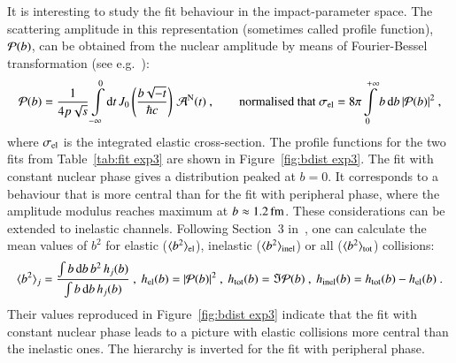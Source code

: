It is interesting to study the fit behaviour in the impact-parameter space. The scattering amplitude in this representation (sometimes called profile function), ${\cal P}(b)$, can be obtained from the nuclear amplitude by means of Fourier-Bessel transformation (see e.g.~\cite{klk02}):
\begin{equation}
\label{eq:prof fun}
	{\cal P}(b) = {1\over 4 p \sqrt s} \int\limits_{-\infty}^0 \d t\,J_0\left(b\sqrt{-t}\over \hbar c\right)\,{\cal A}^{\rm N}(t)\ ,\qquad
	\hbox{normalised that } {\sigma_{\rm el} = 8\pi \int\limits_0^{+\infty} b\, \d b\, |{\cal P}(b)|^2}\ ,
\end{equation}
where $\sigma_{\rm el}$ is the integrated elastic cross-section. The profile functions for the two fits from Table~\ref{tab:fit exp3} are shown in Figure~\ref{fig:bdist exp3}. The fit with constant nuclear phase gives a distribution peaked at $b=0$. It corresponds to a behaviour that is more central than for the fit with peripheral phase, where the amplitude modulus reaches maximum at $b\approx 1.2\,{\rm fm}$. These considerations can be extended to inelastic channels. Following Section~3 in~\cite{klk02}, one can calculate the mean values of $b^2$ for elastic ($\langle b^2\rangle_{\rm el}$), inelastic ($\langle b^2\rangle_{\rm inel}$) or all ($\langle b^2\rangle_{\rm tot}$) collisions:
\begin{equation}
\label{eq:ms b}
	\langle b^2\rangle_j = {
		\int b\,\d b\,b^2\, h_j(b)
		\over
		\int b\,\d b\, h_j(b)
	}\ ,\ 
	h_{\rm el}(b) = |{\cal P}(b)|^2\ ,\ 
	h_{\rm tot}(b) = \Im {\cal P}(b)\ ,\ 
	h_{\rm inel}(b) = h_{\rm tot}(b) - h_{\rm el}(b)\ .
\end{equation}
Their values reproduced in Figure~\ref{fig:bdist exp3} indicate that the fit with constant nuclear phase leads to a picture with elastic collisions more central than the inelastic ones. The hierarchy is inverted for the fit with peripheral phase.



